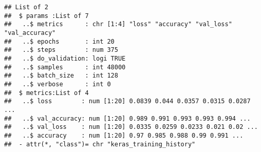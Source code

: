 \documentclass[]{article}
\newenvironment{Shaded}{\begin{snugshade}}{\end{snugshade}}
\newcommand{\DataTypeTok}[1]{\textcolor[rgb]{0.13,0.29,0.53}{#1}}
\newcommand{\DecValTok}[1]{\textcolor[rgb]{0.00,0.00,0.81}{#1}}
\newcommand{\FloatTok}[1]{\textcolor[rgb]{0.00,0.00,0.81}{#1}}
\newcommand{\KeywordTok}[1]{\textcolor[rgb]{0.13,0.29,0.53}{\textbf{#1}}}
\newcommand{\NormalTok}[1]{#1}
\newcommand{\OperatorTok}[1]{\textcolor[rgb]{0.81,0.36,0.00}{\textbf{#1}}}
\newcommand{\StringTok}[1]{\textcolor[rgb]{0.31,0.60,0.02}{#1}}
\begin{document}
\begin{Shaded}
\end{Shaded}

\begin{verbatim}
## List of 2
##  $ params :List of 7
##   ..$ metrics      : chr [1:4] "loss" "accuracy" "val_loss" "val_accuracy"
##   ..$ epochs       : int 20
##   ..$ steps        : num 375
##   ..$ do_validation: logi TRUE
##   ..$ samples      : int 48000
##   ..$ batch_size   : int 128
##   ..$ verbose      : int 0
##  $ metrics:List of 4
##   ..$ loss        : num [1:20] 0.0839 0.044 0.0357 0.0315 0.0287 ...
##   ..$ val_accuracy: num [1:20] 0.989 0.991 0.993 0.993 0.994 ...
##   ..$ val_loss    : num [1:20] 0.0335 0.0259 0.0233 0.021 0.02 ...
##   ..$ accuracy    : num [1:20] 0.97 0.985 0.988 0.99 0.991 ...
##  - attr(*, "class")= chr "keras_training_history"
\end{verbatim}
\end{document}
